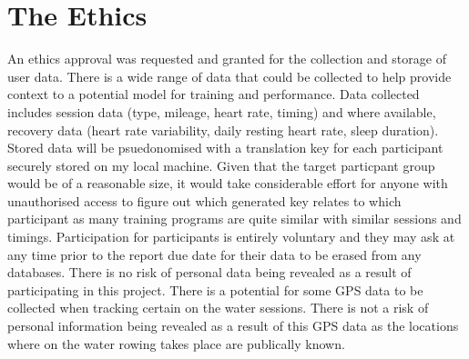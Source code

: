 \documentclass[a4paper]{article}
\begin{document}
\section{The Ethics}
An ethics approval was requested and granted for the collection and storage of user data. There is a wide range of data that could be collected to help provide context to a potential model for training and performance. Data collected includes session data (type, mileage, heart rate, timing) and where available, recovery data (heart rate variability, daily resting heart rate, sleep duration). Stored data will be psuedonomised with a translation key for each participant securely stored on my local machine. Given that the target particpant group would be of a reasonable size, it would take considerable effort for anyone with unauthorised access to figure out which generated key relates to which participant as many training programs are quite similar with similar sessions and timings. Participation for participants is entirely voluntary and they may ask at any time prior to the report due date for their data to be erased from any databases. There is no risk of personal data being revealed as a result of participating in this project. There is a potential for some GPS data to be collected when tracking certain on the water sessions. There is not a risk of personal information being revealed as a result of this GPS data as the locations where on the water rowing takes place are publically known.

% 
% 
\printbibliography
\end{document}
